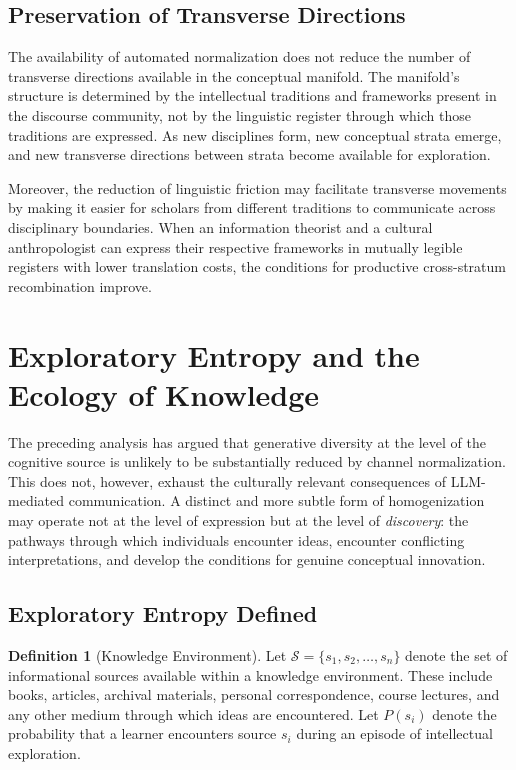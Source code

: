 \documentclass[12pt,a4paper]{article}
\theoremstyle{definition}
\newtheorem{definition}{Definition}[section]
\theoremstyle{plain}
\theoremstyle{remark}
\newcommand{\calS}{\mathcal{S}}
\begin{document}
\subsection{Preservation of Transverse Directions}

The availability of automated normalization does not reduce the number of transverse
directions available in the conceptual manifold. The manifold's structure is determined by
the intellectual traditions and frameworks present in the discourse community, not by the
linguistic register through which those traditions are expressed. As new disciplines form,
new conceptual strata emerge, and new transverse directions between strata become available
for exploration.

Moreover, the reduction of linguistic friction may facilitate transverse movements by making
it easier for scholars from different traditions to communicate across disciplinary
boundaries. When an information theorist and a cultural anthropologist can express their
respective frameworks in mutually legible registers with lower translation costs, the
conditions for productive cross-stratum recombination improve.

\section{Exploratory Entropy and the Ecology of Knowledge}
\label{sec:exploratory}

The preceding analysis has argued that generative diversity at the level of the cognitive
source is unlikely to be substantially reduced by channel normalization. This does not,
however, exhaust the culturally relevant consequences of LLM-mediated communication. A
distinct and more subtle form of homogenization may operate not at the level of expression
but at the level of \emph{discovery}: the pathways through which individuals encounter ideas,
encounter conflicting interpretations, and develop the conditions for genuine conceptual
innovation.

\subsection{Exploratory Entropy Defined}

\begin{definition}[Knowledge Environment]
Let $\calS = \{s_1, s_2, \ldots, s_n\}$ denote the set of informational sources available
within a knowledge environment. These include books, articles, archival materials, personal
correspondence, course lectures, and any other medium through which ideas are encountered.
Let $P(s_i)$ denote the probability that a learner encounters source $s_i$ during an episode
of intellectual exploration.
\end{definition}
\end{document}
